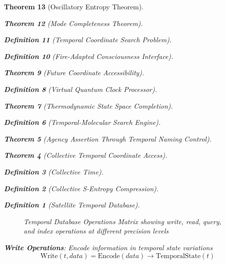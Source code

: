 \documentclass[12pt,a4paper]{article}
\newtheorem{theorem}{Theorem}[section]
\newtheorem{definition}[theorem]{Definition}
\begin{document}
\begin{theorem}[Oscillatory Entropy Theorem]
\begin{theorem}[Mode Completeness Theorem]
\begin{enumerate}
\begin{definition}[Temporal Coordinate Search Problem]
\begin{algorithm}
\begin{definition}[Fire-Adapted Consciousness Interface]
\begin{theorem}[Future Coordinate Accessibility]
\begin{definition}[Virtual Quantum Clock Processor]
\begin{itemize}
\begin{itemize}
\begin{theorem}[Thermodynamic State Space Completion]
\begin{definition}[Temporal-Molecular Search Engine]
\begin{theorem}[Agency Assertion Through Temporal Naming Control]
\begin{remark}
\begin{theorem}[Collective Temporal Coordinate Access]
\begin{definition}[Collective Time]
\begin{definition}[Collective S-Entropy Compression]
\begin{definition}[Satellite Temporal Database]
\begin{algorithm}
\begin{table}[h]
{{\begin{figure}[H]
\caption{Temporal Database Operations Matrix showing write, read, query, and index operations at different precision levels}
\label{fig:temporal_database_operations}
\end{figure}

\textbf{Write Operations}: Encode information in temporal state variations
$$\text{Write}(t, data) = \text{Encode}(data) \rightarrow \text{TemporalState}(t)$$

}}
\end{table}
\end{algorithm}
\end{definition}
\end{definition}
\end{definition}
\end{theorem}
\end{remark}
\end{theorem}
\end{definition}
\end{theorem}
\end{itemize}
\end{itemize}
\end{definition}
\end{theorem}
\end{definition}
\end{algorithm}
\end{definition}
\end{enumerate}
\end{theorem}
\end{theorem}
\end{document}
